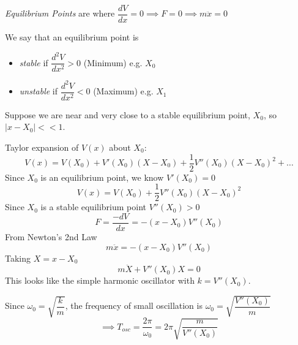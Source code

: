 \documentclass[twoside]{scrartcl}
\newcommand{\vsp}{\vspace*{5pt}}
\begin{document}
\vsp

\begin{definition}
\emph{Equilibrium Points} are where $\dfrac{dV}{dx} = 0 \implies F = 0 \implies m\ddot{x} = 0$

We say that an equilibrium point is 
\begin{itemize}
\item  \emph{stable} if $\dfrac{d^2V}{dx^2} > 0$ (Minimum) e.g. $X_0$ 
\item \emph{unstable} if $\dfrac{d^2V}{dx^2} < 0$ (Maximum) e.g. $X_1$
 \end{itemize}

\end{definition}

Suppose we are near and very close to a stable equilibrium point, $X_0$, so $|x - X_0| << 1$. 

Taylor expansion of $V(x)$ about $X_0$:
\begin{equation}V(x) = V(X_0) + V'(X_0)(X-X_0) + \frac{1}{2}V''(X_0)(X-X_0)^2 + \dots	
\end{equation}
Since $X_0$ is an equilibrium point, we know $V'(X_0) = 0$
\[V(x) = V(X_0)+ \frac{1}{2}V''(X_0)(X-X_0)^2 \]
Since $X_0$ is a stable equilibrium point $V''(X_0) >0$
\[F = \frac{-dV}{dx} = -(x-X_0)V''(X_0)\]
From Newton's 2nd Law
\[m\ddot{x} = -(x-X_0)V''(X_0)\]
Taking $X = x-X_0$
\[m\ddot{X} + V''(X_0)X = 0\]
This looks like the simple harmonic oscillator with $k = V''(X_0)$.

 Since $\omega_0 = \sqrt{\dfrac{k}{m}}$, the frequency of small oscillation is $\omega_0 = \sqrt{\dfrac{V''(X_0)}{m}}$
\[\implies T_{osc} = \frac{2\pi}{\omega_0} = 2\pi \sqrt{\dfrac{m}{V''(X_0)}}\]~
\end{document}
